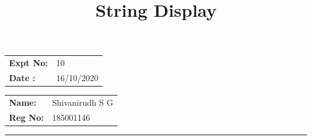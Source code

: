 \documentclass[12pt,a4paper]{article}
\title{\bf String Display}
\author{\vspace{-10ex}}
\date{\vspace{-10ex}}
\begin{document}
\maketitle

\begin{minipage}{0.45\textwidth}
        \begin{tabular}{l l}
            \textbf{Expt No:}&10\\
            \textbf{Date :}&16/10/2020
        \end{tabular}
\end{minipage}%
\begin{minipage}{0.45\textwidth}
        \begin{tabular}{l l}
             \textbf{Name:}& Shivanirudh S G  \\
             \textbf{Reg No:} & 185001146 
        \end{tabular}
\end{minipage}
\vspace{1cm}
\hrule
\end{document}
